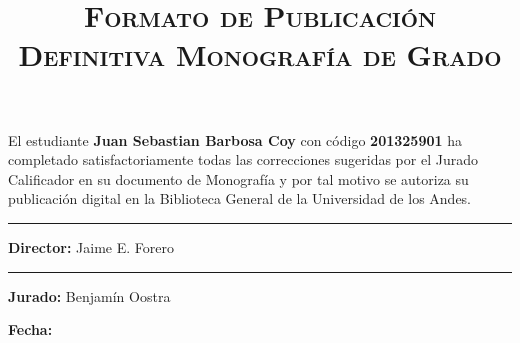 \documentclass[lettersize, 12pt]{article}
\title{\scshape Formato de Publicación Definitiva Monografía de Grado}
\date{}
\begin{document}
	
	\maketitle
	\thispagestyle{empty}
	
	El estudiante \textbf{Juan Sebastian Barbosa Coy} con código \textbf{201325901} ha completado satisfactoriamente todas las correcciones sugeridas por el Jurado Calificador en su documento de Monografía y por tal motivo se autoriza su publicación digital en la Biblioteca General de la Universidad de los Andes.
	
	\vspace{3cm}
	\begin{multicols}{2}
		\rule{6cm}{1pt}
		\vspace{0.5cm}
		
		\textbf{Director:} Jaime E. Forero
		
		\rule{6cm}{1pt}
		\vspace{0.5cm}
		
		\textbf{Jurado:} Benjamín Oostra
	\end{multicols}
	
	
	\vspace{6cm}
	
	\textbf{Fecha:}
\end{document}
